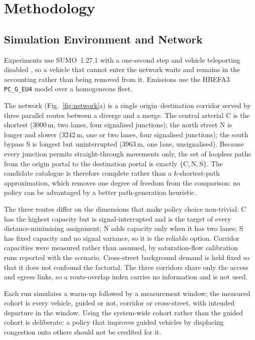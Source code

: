\documentclass[preprint,12pt]{elsarticle}
\begin{document}
\section{Methodology}
\label{sec:method}

\subsection{Simulation Environment and Network}
\label{sec:method:net}

Experiments use SUMO~1.27.1 with a one-second step and vehicle teleporting
disabled \citep{lopez2018sumo}, so a vehicle that cannot enter the network waits
and remains in the accounting rather than being removed from it. Emissions use
the HBEFA3 \texttt{PC\_G\_EU4} model \citep{krajzewicz2015emissions} over a
homogeneous fleet.

The network (Fig.~\ref{fig:network}a) is a single origin--destination corridor
served by three parallel routes between a diverge and a merge. The central
arterial C is the shortest (3000\,m, two lanes, four signalised junctions); the
north street N is longer and slower (3242\,m, one or two lanes, four signalised
junctions); the south bypass S is longest but uninterrupted (3963\,m, one lane,
unsignalised). Because every junction permits straight-through movements only,
the set of loopless paths from the origin portal to the destination portal is
exactly $\{\mathrm{C},\mathrm{N},\mathrm{S}\}$. The candidate catalogue is
therefore complete rather than a $k$-shortest-path approximation, which removes
one degree of freedom from the comparison: no policy can be advantaged by a
better path-generation heuristic.

The three routes differ on the dimensions that make policy choice non-trivial:
C has the highest capacity but is signal-interrupted and is the target of every
distance-minimising assignment; N adds capacity only when it has two lanes; S
has fixed capacity and no signal variance, so it is the reliable option. Corridor
capacities were measured rather than assumed, by saturation-flow calibration runs
reported with the scenario. Cross-street background demand is held fixed so that
it does not confound the factorial. The three corridors share only the access and
egress links, so a route-overlap index carries no information and is not used.

Each run simulates a warm-up followed by a measurement window; the measured
cohort is every vehicle, guided or not, corridor or cross-street, with intended
departure in the window. Using the system-wide cohort rather than the guided
cohort is deliberate: a policy that improves guided vehicles by displacing
congestion onto others should not be credited for it.
\end{document}
